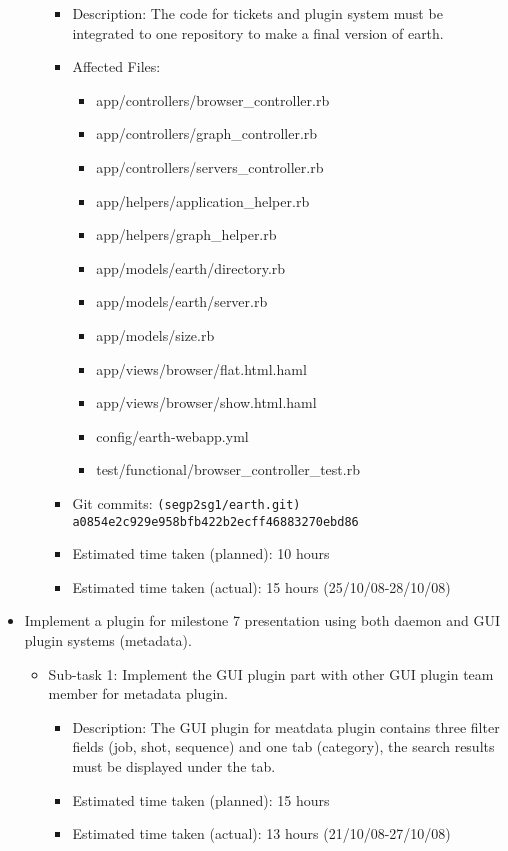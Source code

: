 \documentclass{article}
\begin{document}
\begin{itemize}
\begin{itemize}
                \begin{itemize}
                    \item Description: The code for tickets and plugin system must be integrated to one repository to make a final version of earth.
		    \item Affected Files:
                	\begin{itemize}
				\item app/controllers/browser\_controller.rb
				\item app/controllers/graph\_controller.rb
				\item app/controllers/servers\_controller.rb
				\item app/helpers/application\_helper.rb
				\item app/helpers/graph\_helper.rb
				\item app/models/earth/directory.rb
				\item app/models/earth/server.rb
				\item app/models/size.rb
				\item app/views/browser/flat.html.haml
				\item app/views/browser/show.html.haml
				\item config/earth-webapp.yml
				\item test/functional/browser\_controller\_test.rb	
                	\end{itemize}
		    \item Git commits: \texttt{(segp2sg1/earth.git) a0854e2c929e958bfb422b2ecff46883270ebd86}
                    \item Estimated time taken (planned): 10 hours
                    \item Estimated time taken (actual): 15 hours (25/10/08-28/10/08)
                \end{itemize}
        \end{itemize}
  \item Implement a plugin for milestone 7 presentation using both daemon and GUI plugin systems (metadata).
        \begin{itemize}
            \item Sub-task 1: Implement the GUI plugin part with other GUI plugin team member for metadata plugin.
                \begin{itemize}
                    \item Description: The GUI plugin for meatdata plugin contains three filter fields (job, shot, sequence) and one tab (category), the search results must be displayed under the tab.
                    \item Estimated time taken (planned): 15 hours
                    \item Estimated time taken (actual):  13 hours (21/10/08-27/10/08)
                \end{itemize}
        \end{itemize}
\end{itemize}
\end{document}
